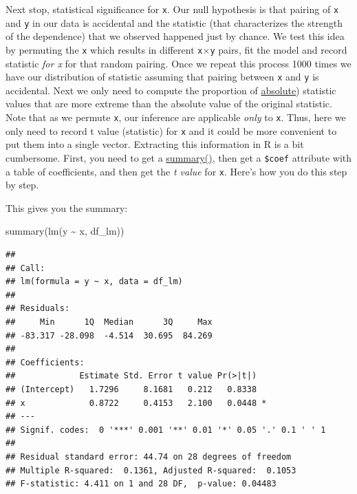 \documentclass[
]{book}
\newenvironment{Shaded}{\begin{snugshade}}{\end{snugshade}}
\newcommand{\FunctionTok}[1]{\textcolor[rgb]{0.00,0.00,0.00}{#1}}
\newcommand{\NormalTok}[1]{#1}
\newcommand{\SpecialCharTok}[1]{\textcolor[rgb]{0.00,0.00,0.00}{#1}}
\begin{document}
Next stop, statistical significance for \texttt{x}. Our null hypothesis is that pairing of \texttt{x} and \texttt{y} in our data is accidental and the statistic (that characterizes the strength of the dependence) that we observed happened just by chance. We test this idea by permuting the \texttt{x} which results in different \texttt{x}×\texttt{y} pairs, fit the model and record statistic \emph{for x} for that random pairing. Once we repeat this process 1000 times we have our distribution of statistic assuming that pairing between \texttt{x} and \texttt{y} is accidental. Next we only need to compute the proportion of \href{https://stat.ethz.ch/R-manual/R-devel/library/base/html/MathFun.html}{absolute}) statistic values that are more extreme than the absolute value of the original statistic. Note that as we permute \texttt{x}, our inference are applicable \emph{only} to \texttt{x}. Thus, here we only need to record t value (statistic) for \texttt{x} and it could be more convenient to put them into a single vector. Extracting this information in R is a bit cumbersome. First, you need to get a \href{https://stat.ethz.ch/R-manual/R-devel/library/stats/html/summary.lm.html}{summary()}, then get a \texttt{\$coef} attribute with a table of coefficients, and then get the \emph{t value} for \texttt{x}. Here's how you do this step by step.

This gives you the summary:

\begin{Shaded}
\begin{Highlighting}[]
\FunctionTok{summary}\NormalTok{(}\FunctionTok{lm}\NormalTok{(y }\SpecialCharTok{\textasciitilde{}}\NormalTok{ x, df\_lm))}
\end{Highlighting}
\end{Shaded}

\begin{verbatim}
## 
## Call:
## lm(formula = y ~ x, data = df_lm)
## 
## Residuals:
##     Min      1Q  Median      3Q     Max 
## -83.317 -28.098  -4.514  30.695  84.269 
## 
## Coefficients:
##             Estimate Std. Error t value Pr(>|t|)  
## (Intercept)   1.7296     8.1681   0.212   0.8338  
## x             0.8722     0.4153   2.100   0.0448 *
## ---
## Signif. codes:  0 '***' 0.001 '**' 0.01 '*' 0.05 '.' 0.1 ' ' 1
## 
## Residual standard error: 44.74 on 28 degrees of freedom
## Multiple R-squared:  0.1361, Adjusted R-squared:  0.1053 
## F-statistic: 4.411 on 1 and 28 DF,  p-value: 0.04483
\end{verbatim}
\end{document}
